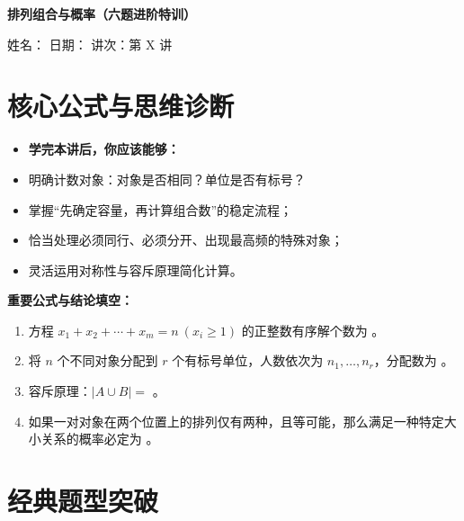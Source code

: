 \documentclass[11pt,a4paper]{ctexart}
\newcommand{\lessoninfo}[4]{%
  \begin{center}
    {\LARGE\bfseries #1}\par
    \vspace{0.8em}
    {\small 姓名：#2 \quad 日期：#3 \quad 讲次：#4}
  \end{center}
  \vspace{0.6em}
}
\begin{document}
\lessoninfo{排列组合与概率（六题进阶特训）}{\blank{2.6cm}}{\blank{2.6cm}}{第 X 讲}

\section{核心公式与思维诊断}

\begin{itemize}[itemsep=0.3em]
  \item \textbf{学完本讲后，你应该能够：}
  \item 明确计数对象：对象是否相同？单位是否有标号？
  \item 掌握“先确定容量，再计算组合数”的稳定流程；
  \item 恰当处理必须同行、必须分开、出现最高频的特殊对象；
  \item 灵活运用对称性与容斥原理简化计算。
\end{itemize}


\vspace{1em}
\noindent\textbf{重要公式与结论填空：}
\begin{enumerate}[itemsep=0.8em]
    \item 方程 $x_1+x_2+\cdots+x_m=n\ (x_i\geqslant 1)$ 的正整数有序解个数为 \blank{3cm}。
    \item 将 $n$ 个不同对象分配到 $r$ 个有标号单位，人数依次为 $n_1,\ldots,n_r$，分配数为 \blank{3cm}。
    \item 容斥原理：$\lvert A\cup B\rvert = $ \blank{6cm}。
    \item 如果一对对象在两个位置上的排列仅有两种，且等可能，那么满足一种特定大小关系的概率必定为 \blank{1cm}。
\end{enumerate}

\newpage

\section{经典题型突破}


{\small \qProbPermDiffBoxesStem}

{\small \qProbPermAvgAllocStem}
\end{document}
